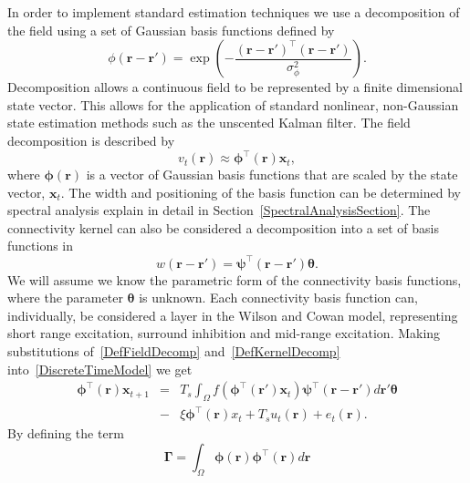 \documentclass[twocolumn,11pt,a4paper]{article}		%
\begin{document}
In order to implement standard estimation techniques we use a decomposition of the field using a set of Gaussian basis functions defined by
\begin{equation}\label{eq:FieldBasisFunction}
	\phi\left(\mathbf{r}-\mathbf{r}'\right) =
\exp{\left(-\frac{(\mathbf{r}-\mathbf{r}')^\top(\mathbf{r}-\mathbf{r}')}{\sigma_{\phi}^2}\right)}. 
\end{equation}
 Decomposition allows a continuous field to be represented by a finite dimensional state vector. This allows for the application of standard nonlinear, non-Gaussian state estimation methods such as the unscented Kalman filter. The field decomposition is described by 
\begin{equation}
	\label{DefFieldDecomp} v_t\left(\mathbf{r}\right) \approx \boldsymbol{\phi}^{\top}\left(\mathbf{r}\right) \mathbf{x}_t, 
\end{equation}
where $\mathbf{\boldsymbol{\phi}}(\mathbf{r})$ is a vector of Gaussian basis functions that are scaled by the state vector, $\mathbf{x}_t$. The width and positioning of the basis function can be determined by spectral analysis explain in detail in Section~\ref{SpectralAnalysisSection}. The connectivity kernel can also be considered a decomposition into a set of basis functions in 
\begin{equation}\label{DefKernelDecomp}
	 w\left(\mathbf{r}-\mathbf{r}'\right) =\boldsymbol{\psi}^\top\left(\mathbf{r}-\mathbf{r}'\right) \boldsymbol{\theta}.
\end{equation}
We will assume we know the parametric form of the connectivity basis functions, where the parameter $\boldsymbol{\theta}$ is unknown. Each connectivity basis function can, individually, be considered a layer in the Wilson and Cowan model, representing short range excitation, surround inhibition and mid-range excitation. Making substitutions of~\ref{DefFieldDecomp} and~\ref{DefKernelDecomp} into~\ref{DiscreteTimeModel} we get 
\begin{eqnarray}
	\label{reduced continuous model}\boldsymbol{\phi}^{\top}(\mathbf{r})\mathbf{x}_{t+1}&=& T_s\int_\Omega{f(\boldsymbol{\phi}^{\top}(\mathbf{r}')\mathbf{x}_t )\boldsymbol{\psi}^{\top}(\mathbf{r}-\mathbf{r}')d\mathbf{r}'}\boldsymbol{\theta}\nonumber \\ 
	&-& \xi\boldsymbol{\phi}^{\top}(\mathbf{r})x_t + T_s u_t(\mathbf{r})+ e_t(\mathbf{r}). 
\end{eqnarray}
By defining the term 
\begin{equation}
	\label{DefGamma} \boldsymbol{\Gamma} = \int_\Omega {\boldsymbol{\phi} \left(\mathbf{r}\right)\boldsymbol{\phi} ^{\top}\left(\mathbf{r}\right)d\mathbf{r}} 
\end{equation}
\end{document}
